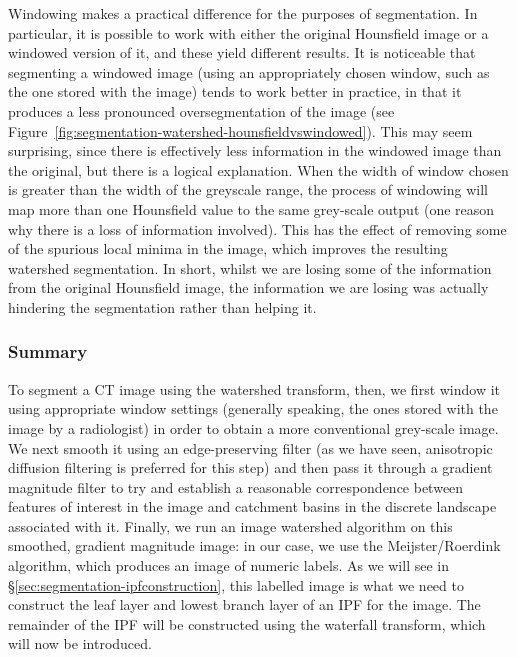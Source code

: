 Windowing makes a practical difference for the purposes of segmentation. In particular, it is possible to work with either the original Hounsfield image or a windowed version of it, and these yield different results. It is noticeable that segmenting a windowed image (using an appropriately chosen window, such as the one stored with the image) tends to work better in practice, in that it produces a less pronounced oversegmentation of the image (see Figure~\ref{fig:segmentation-watershed-hounsfieldvswindowed}). This may seem surprising, since there is effectively less information in the windowed image than the original, but there is a logical explanation. When the width of window chosen is greater than the width of the greyscale range, the process of windowing will map more than one Hounsfield value to the same grey-scale output (one reason why there is a loss of information involved). This has the effect of removing some of the spurious local minima in the image, which improves the resulting watershed segmentation. In short, whilst we are losing some of the information from the original Hounsfield image, the information we are losing was actually hindering the segmentation rather than helping it.

\subsubsection{Summary}

To segment a CT image using the watershed transform, then, we first window it using appropriate window settings (generally speaking, the ones stored with the image by a radiologist) in order to obtain a more conventional grey-scale image. We next smooth it using an edge-preserving filter (as we have seen, anisotropic diffusion filtering is preferred for this step) and then pass it through a gradient magnitude filter to try and establish a reasonable correspondence between features of interest in the image and catchment basins in the discrete landscape associated with it. Finally, we run an image watershed algorithm on this smoothed, gradient magnitude image: in our case, we use the Meijster/Roerdink algorithm, which produces an image of numeric labels. As we will see in \S\ref{sec:segmentation-ipfconstruction}, this labelled image is what we need to construct the leaf layer and lowest branch layer of an IPF for the image. The remainder of the IPF will be constructed using the waterfall transform, which will now be introduced.

\clearpage

